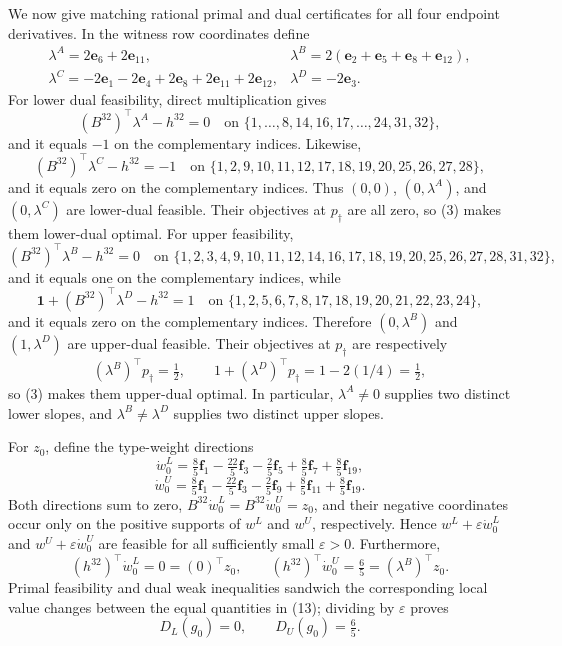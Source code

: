 We now give matching rational primal and dual certificates for all four endpoint derivatives.  In the witness row coordinates define
\[
\begin{array}{ll}
\lambda^A=2\mathbf e_6+2\mathbf e_{11},
&\lambda^B=2(\mathbf e_2+\mathbf e_5+\mathbf e_8+\mathbf e_{12}),\\
\lambda^C=-2\mathbf e_1-2\mathbf e_4+2\mathbf e_8+2\mathbf e_{11}+2\mathbf e_{12},
&\lambda^D=-2\mathbf e_3.
\end{array}
\tag{11}
\]
For lower dual feasibility, direct multiplication gives
\[
(B^{32})^{\top}\lambda^A-h^{32}=0
\quad\text{on }\{1,\ldots,8,14,16,17,\ldots,24,31,32\},
\]
and it equals \(-1\) on the complementary indices.  Likewise,
\[
(B^{32})^{\top}\lambda^C-h^{32}=-1
\quad\text{on }\{1,2,9,10,11,12,17,18,19,20,25,26,27,28\},
\]
and it equals zero on the complementary indices.  Thus \((0,0)\), \((0,\lambda^A)\), and \((0,\lambda^C)\) are lower-dual feasible.  Their objectives at \(p_\dagger\) are all zero, so (3) makes them lower-dual optimal.  For upper feasibility,
\[
(B^{32})^{\top}\lambda^B-h^{32}=0
\quad\text{on }\{1,2,3,4,9,10,11,12,14,16,17,18,19,20,25,26,27,28,31,32\},
\]
and it equals one on the complementary indices, while
\[
\mathbf 1+(B^{32})^{\top}\lambda^D-h^{32}=1
\quad\text{on }\{1,2,5,6,7,8,17,18,19,20,21,22,23,24\},
\]
and it equals zero on the complementary indices.  Therefore \((0,\lambda^B)\) and \((1,\lambda^D)\) are upper-dual feasible.  Their objectives at \(p_\dagger\) are respectively
\[
(\lambda^B)^{\top}p_\dagger=\tfrac12,
\qquad
1+(\lambda^D)^{\top}p_\dagger=1-2(1/4)=\tfrac12,
\]
so (3) makes them upper-dual optimal.  In particular, \(\lambda^A\neq0\) supplies two distinct lower slopes, and \(\lambda^B\neq\lambda^D\) supplies two distinct upper slopes.

For \(z_0\), define the type-weight directions
\[
\dot w^L_0=\tfrac85\mathbf f_1-\tfrac{22}{5}\mathbf f_3-\tfrac25\mathbf f_5
+\tfrac85\mathbf f_7+\tfrac85\mathbf f_{19},
\]
\[
\dot w^U_0=\tfrac85\mathbf f_1-\tfrac{22}{5}\mathbf f_3-\tfrac25\mathbf f_9
+\tfrac85\mathbf f_{11}+\tfrac85\mathbf f_{19}.
\tag{12}
\]
Both directions sum to zero, \(B^{32}\dot w^L_0=B^{32}\dot w^U_0=z_0\), and their negative coordinates occur only on the positive supports of \(w^L\) and \(w^U\), respectively.  Hence \(w^L+\varepsilon\dot w^L_0\) and \(w^U+\varepsilon\dot w^U_0\) are feasible for all sufficiently small \(\varepsilon>0\).  Furthermore,
\[
(h^{32})^{\top}\dot w^L_0=0=(0)^{\top}z_0,
\qquad
(h^{32})^{\top}\dot w^U_0=\tfrac65=(\lambda^B)^{\top}z_0.
\tag{13}
\]
Primal feasibility and dual weak inequalities sandwich the corresponding local value changes between the equal quantities in (13); dividing by \(\varepsilon\) proves
\[
D_L(g_0)=0,\qquad D_U(g_0)=\tfrac65.
\tag{14}
\]

